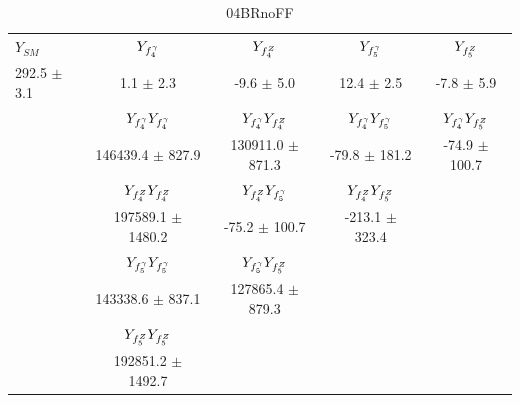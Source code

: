 \begin{table}[htbp]
\small
\centering
\begin{tabular}{lcccc}
\hline\hline
       $Y_{SM}$ &             $Y_{f_{4}^{\gamma}}$ &             $Y_{f_{4}^{Z}}$ &             $Y_{f_{5}^{\gamma}}$ &             $Y_{f_{5}^{Z}}$ \\
292.5 $\pm$ 3.1 &             1.1 $\pm$ 2.3 &            -9.6 $\pm$ 5.0 &            12.4 $\pm$ 2.5 &            -7.8 $\pm$ 5.9 \\
\hline
                &  $Y_{f_{4}^{\gamma}}Y_{f_{4}^{\gamma}}$ &  $Y_{f_{4}^{\gamma}}Y_{f_{4}^{Z}}$ &  $Y_{f_{4}^{\gamma}}Y_{f_{5}^{\gamma}}$ &  $Y_{f_{4}^{\gamma}}Y_{f_{5}^{Z}}$ \\
                &      146439.4 $\pm$ 827.9 &      130911.0 $\pm$ 871.3 &         -79.8 $\pm$ 181.2 &         -74.9 $\pm$ 100.7 \\
\hline
                &  $Y_{f_{4}^{Z}}Y_{f_{4}^{Z}}$ &  $Y_{f_{4}^{Z}}Y_{f_{5}^{\gamma}}$ &  $Y_{f_{4}^{Z}}Y_{f_{5}^{Z}}$ \\
                &     197589.1 $\pm$ 1480.2 &         -75.2 $\pm$ 100.7 &        -213.1 $\pm$ 323.4 \\
\hline
                &  $Y_{f_{5}^{\gamma}}Y_{f_{5}^{\gamma}}$ &  $Y_{f_{5}^{\gamma}}Y_{f_{5}^{Z}}$ \\
                &      143338.6 $\pm$ 837.1 &      127865.4 $\pm$ 879.3 \\
\hline
                &  $Y_{f_{5}^{Z}}Y_{f_{5}^{Z}}$ \\
                &     192851.2 $\pm$ 1492.7 \\
\hline\hline
\end{tabular}
\caption{04BRnoFF}
\end{table}

